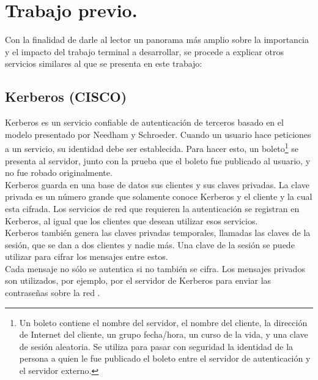 \documentclass[12pt, a4paper, titlepage]{report}
\begin{document}
		\section{Trabajo previo.}
    	    
            Con la finalidad de darle al lector un panorama más amplio sobre la importancia y el impacto del trabajo terminal a desarrollar, se procede a explicar otros servicios similares al que se presenta en este trabajo:\\
            
            \subsection{Kerberos (CISCO)}
                Kerberos es un servicio confiable de autenticación de terceros basado en el modelo presentado por Needham y Schroeder. Cuando un usuario hace peticiones a un servicio, su identidad debe ser establecida. Para hacer esto, un boleto\footnote{Un boleto contiene el nombre del servidor, el nombre del cliente, la dirección de Internet del cliente, un grupo fecha/hora, un curso de la vida, y una clave de sesión aleatoria. Se utiliza para pasar con seguridad la identidad de la persona a quien le fue publicado el boleto entre el servidor de autenticación y el servidor externo.} se presenta al servidor, junto con la prueba que el boleto fue publicado al usuario, y no fue robado originalmente. \\ Kerberos guarda en una base de datos sus clientes y sus claves privadas. La clave privada es un número grande que solamente conoce Kerberos y el cliente y la cual esta cifrada. Los servicios de red que requieren la autenticación se registran en Kerberos, al igual que los clientes que desean utilizar esos servicios.\\
                Kerberos también genera las claves privadas temporales, llamadas las claves de la sesión, que se dan a dos clientes y nadie más. Una clave de la sesión se puede utilizar para cifrar los mensajes entre estos.\\
                Cada mensaje no sólo se autentica si no también se cifra. Los mensajes privados son utilizados, por ejemplo, por el servidor de Kerberos para enviar las contraseñas sobre la red \cite{refKerberos}.\\
                
\end{document}
